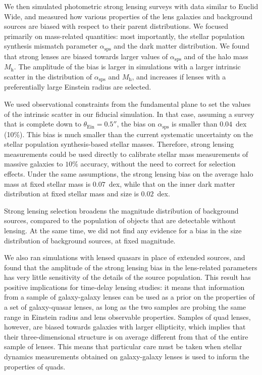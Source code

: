 \documentclass{aa}
\def\asps{\alpha_{\mathrm{sps}}}
\def\mhalo{M_{\mathrm{h}}}
\def\tein{\theta_{\mathrm{Ein}}}
\begin{document}
We then simulated photometric strong lensing surveys with data similar to Euclid Wide, and measured how various properties of the lens galaxies and background sources are biased with respect to their parent distributions.
We focused primarily on mass-related quantities: most importantly, the stellar population synthesis mismatch parameter $\asps$ and the dark matter distribution.
We found that strong lenses are biased towards larger values of $\asps$ and of the halo mass $\mhalo$.
The amplitude of the bias is larger in simulations with a larger intrinsic scatter in the distribution of $\asps$ and $\mhalo$, and increases if lenses with a preferentially large Einstein radius are selected.

We used observational constraints from the fundamental plane to set the values of the intrinsic scatter in our fiducial simulation.
In that case, assuming a survey that is complete down to $\tein=0.5''$, the bias on $\asps$ is smaller than $0.04$~dex (10\%). This bias is much smaller than the current systematic uncertainty on the stellar population synthesis-based stellar masses. Therefore, strong lensing measurements could be used directly to calibrate stellar mass measurements of massive galaxies to $10\%$ accuracy, without the need to correct for selection effects.
Under the same assumptions, the strong lensing bias on the average halo mass at fixed stellar mass is $0.07$~dex, while that on the inner dark matter distribution at fixed stellar mass and size is $0.02$~dex.

Strong lensing selection broadens the magnitude distribution of background sources, compared to the population of objects that are detectable without lensing.
At the same time, we did not find any evidence for a bias in the size distribution of background sources, at fixed magnitude.

We also ran simulations with lensed quasars in place of extended sources, and found that the amplitude of the strong lensing bias in the lens-related parameters has very little sensitivity of the details of the source population.
This result has positive implications for time-delay lensing studies: it means that information from a sample of galaxy-galaxy lenses can be used as a prior on the properties of a set of galaxy-quasar lenses, as long as the two samples are probing the same range in Einstein radius and lens observable properties.
Samples of quad lenses, however, are biased towards galaxies with larger ellipticity, which implies that their three-dimensional structure is on average different from that of the entire sample of lenses. This means that particular care must be taken when stellar dynamics measurements obtained on galaxy-galaxy lenses is used to inform the properties of quads.
\end{document}
